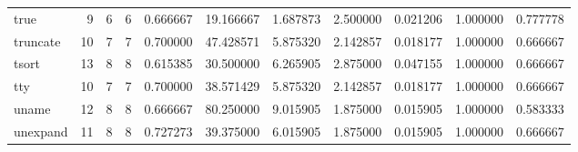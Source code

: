 \begin{longtable}{lrrrrrrrrrr}
true      &                                       9 &                  6 &                                 6 &                                   0.666667 &                              19.166667 &                                     1.687873 &                          2.500000 &                                0.021206 &                           1.000000 &                                           0.777778 \\
truncate  &                                      10 &                  7 &                                 7 &                                   0.700000 &                              47.428571 &                                     5.875320 &                          2.142857 &                                0.018177 &                           1.000000 &                                           0.666667 \\
tsort     &                                      13 &                  8 &                                 8 &                                   0.615385 &                              30.500000 &                                     6.265905 &                          2.875000 &                                0.047155 &                           1.000000 &                                           0.666667 \\
tty       &                                      10 &                  7 &                                 7 &                                   0.700000 &                              38.571429 &                                     5.875320 &                          2.142857 &                                0.018177 &                           1.000000 &                                           0.666667 \\
uname     &                                      12 &                  8 &                                 8 &                                   0.666667 &                              80.250000 &                                     9.015905 &                          1.875000 &                                0.015905 &                           1.000000 &                                           0.583333 \\
unexpand  &                                      11 &                  8 &                                 8 &                                   0.727273 &                              39.375000 &                                     6.015905 &                          1.875000 &                                0.015905 &                           1.000000 &                                           0.666667 \\

\end{longtable}

